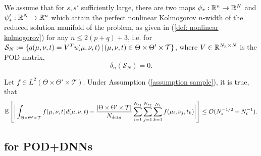 \begin{assumption} \label{assumption perfect embedding}
    We assume that for $s, s'$ sufficiently large, there are two maps $\psi_*: \mathbb{R}^n \to \mathbb{R}^N$ and $\psi_*': \mathbb{R}^N \to \mathbb{R}^n$ which attain the perfect nonlinear Kolmogorov $n$-width of the reduced solution manifold of the problem, as given in (\ref{def: nonlinear kolmogorov}) for any $n \leq 2(p + q) + 3$, i.e.
    for $\mathcal{S}_N := \{ q(\mu, \nu, t) = V^T u(\mu, \nu, t) \, \vert \, (\mu, \nu, t) \in \Theta \times \Theta' \times \mathcal{T} \}$, where $V \in \mathbb{R}^{N_h \times N}$ is the POD matrix,
    \begin{equation*}
        \delta_n(\mathcal{S}_N) = 0.
    \end{equation*}
\end{assumption}



\begin{proposition} \label{prop: order of convergence for sample}
    Let $f \in L^2(\Theta \times \Theta' \times \mathcal{T})$. Under Assumption (\ref{assumption sample}), it is true, that
    \begin{equation*}
        \mathbb{E}\left[ \bigg\vert \int_{\Theta \times \Theta' \times \mathcal{T}} f(\mu, \nu, t) d(\mu, \nu, t) - \frac{\vert \Theta \times \Theta' \times \mathcal{T} \vert}{N_{data}} \sum_{i = 1}^{N_{s_1}} \sum_{j = 1}^{N_{s_2}} \sum_{k = 1}^{N_t} f(\mu_i, \nu_j, t_k) \bigg\vert \right] \leq \mathcal{O}(N_s^{-1/2} + N_t^{-1}).
    \end{equation*}
\end{proposition}


\subsection{for POD+DNNs}



